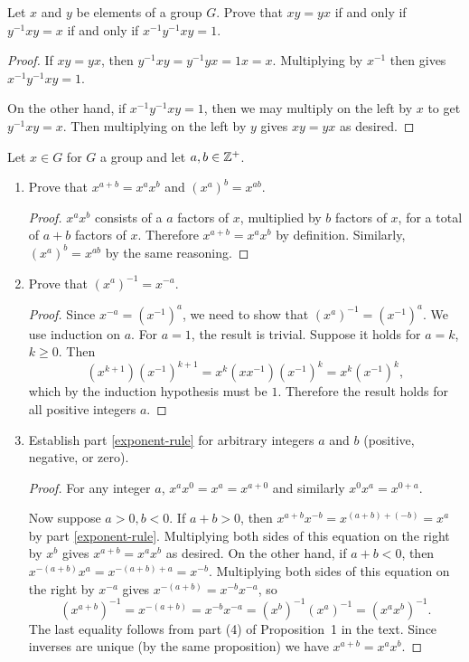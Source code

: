  Let $x$ and $y$ be elements of a group $G$. Prove that
$xy = yx$ if and only if $y^{-1}xy = x$ if and only if
$x^{-1}y^{-1}xy = 1$.
\begin{proof}
  If $xy = yx$, then $y^{-1}xy = y^{-1}yx = 1x = x$. Multiplying by
  $x^{-1}$ then gives $x^{-1}y^{-1}xy = 1$.

  On the other hand, if $x^{-1}y^{-1}xy = 1$, then we may multiply on
  the left by $x$ to get $y^{-1}xy = x$. Then multiplying on the left
  by $y$ gives $xy = yx$ as desired.
\end{proof}

 Let $x\in G$ for $G$ a group and let $a,b\in\mathbb{Z}^+$.
\label{exercise-exponent-rules}
\begin{enumerate}
\item Prove that $x^{a+b} = x^ax^b$ and $(x^a)^b = x^{ab}$.
  \label{exponent-rule}
  \begin{proof}
    $x^ax^b$ consists of a $a$ factors of $x$, multiplied by $b$
    factors of $x$, for a total of $a+b$ factors of $x$. Therefore
    $x^{a+b} = x^ax^b$ by definition. Similarly, $(x^a)^b = x^{ab}$ by
    the same reasoning.
  \end{proof}
\item Prove that $(x^a)^{-1} = x^{-a}$.
  \begin{proof}
    Since $x^{-a} = (x^{-1})^a$, we need to show that
    $(x^a)^{-1} = (x^{-1})^a$. We use induction on $a$. For $a = 1$,
    the result is trivial. Suppose it holds for $a = k$,
    $k\geq0$. Then
    \begin{equation*}
      (x^{k+1})(x^{-1})^{k+1}
      = x^k(xx^{-1})(x^{-1})^k
      = x^k(x^{-1})^k,
    \end{equation*}
    which by the induction hypothesis must be $1$. Therefore the
    result holds for all positive integers $a$.
  \end{proof}
\item Establish part \ref{exponent-rule} for arbitrary integers $a$
  and $b$ (positive, negative, or zero).
  \begin{proof}
    For any integer $a$, $x^ax^0 = x^a = x^{a+0}$ and similarly
    $x^0x^a = x^{0+a}$.

    Now suppose $a>0,b<0$. If $a + b > 0$, then
    $x^{a+b}x^{-b} = x^{(a+b)+(-b)} = x^a$ by part
    \ref{exponent-rule}. Multiplying both sides of this equation on
    the right by $x^b$ gives $x^{a+b} = x^ax^b$ as desired. On the
    other hand, if $a + b < 0$, then
    $x^{-(a+b)}x^a = x^{-(a+b)+a} = x^{-b}$. Multiplying both sides of
    this equation on the right by $x^{-a}$ gives
    $x^{-(a+b)} = x^{-b}x^{-a}$, so
    \begin{equation*}
      (x^{a+b})^{-1}
      = x^{-(a+b)} = x^{-b}x^{-a} = (x^b)^{-1}(x^a)^{-1}
      = (x^ax^b)^{-1}.
    \end{equation*}
    The last equality follows from part (4) of Proposition~1 in the
    text. Since inverses are unique (by the same proposition) we have
    $x^{a+b} = x^ax^b$.


\end{proof}
\end{enumerate}
